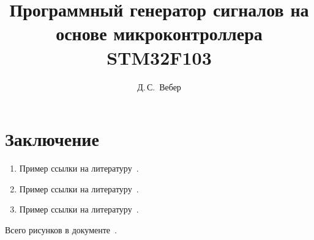 \documentclass[14pt, oneside]{altsu-bachelor}
\title{Программный генератор сигналов на основе микроконтроллера STM32F103}
\author{Д.\,С.~Вебер}
\institute{Институт цифровых технологий, электроники и физики}
\date{\the\year}
\begin{document}
\maketitle

\setcounter{page}{2}
\makeabstract
\tableofcontents






\chapter*{Заключение}

\begin{enumerate}
\item Пример ссылки на литературу~\cite{wikiRUBitbucket}.
\item Пример ссылки на литературу~\cite{wikiRUIdSoftware}.
\item Пример ссылки на литературу~\cite{wikiRUGitHub}.
\end{enumerate}

Всего рисунков в документе~\totalfigures.
\newpage
{}
\printbibliography[title={Список использованной литературы}]



\makelastpage
\end{document}
